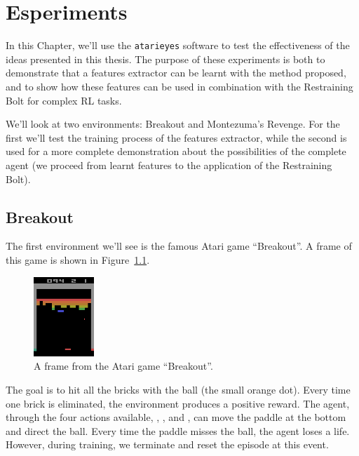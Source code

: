 \chapter{Esperiments}

\label{ch:experiments}

In this Chapter, we'll use the \texttt{atarieyes} software to test the
effectiveness of the ideas presented in this thesis. The purpose of these
experiments is both to demonstrate that a features extractor can be learnt
with the method proposed, and to show how these features can be used
in combination with the Restraining Bolt for complex RL tasks.

We'll look at two environments: Breakout and Montezuma's Revenge. For the
first we'll test the training process of the features extractor, while the
second is used for a more complete demonstration about the possibilities of
the complete agent (we proceed from learnt features to the application
of the Restraining Bolt).

\let\sectionbreak\dontbreakhere

\section{Breakout}

\label{sec:exp-breakout}

The first environment we'll see is the famous Atari game ``Breakout''.
A frame of this game is shown in Figure~\ref{fig:breakout-frame}.
\begin{figure}
	\centering
	\includegraphics[height=3cm]{./imgs/br1.png}
	\caption{A frame from the Atari game ``Breakout''.}
	\label{fig:breakout-frame}
\end{figure}
The goal is to hit all the bricks with the ball (the small orange dot). Every
time one brick is eliminated, the environment produces a positive reward. The
agent, through the four actions available, , ,
 and , can move the paddle at the bottom and direct
the ball. Every time the paddle misses the ball, the agent loses a life.
However, during training, we terminate and reset the episode at this event.

